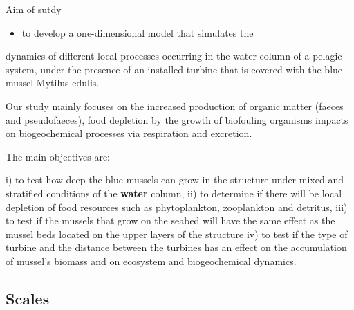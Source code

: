 \documentclass[final,xcolor=dvipsnames]{beamer}
\begin{document}
\begin{frame}
\begin{block}{Aim of sutdy}
\begin{itemize}
    \item to develop a one-dimensional model that simulates the
\end{itemize} 
dynamics of different local processes occurring in the water column of a pelagic
system, under the presence of an installed turbine that is covered with the blue
mussel Mytilus edulis.

Our study mainly focuses on
the increased production of organic matter (faeces and pseudofaeces),
food depletion by the growth of biofouling organisms
impacts on biogeochemical processes via respiration and excretion. 

The main objectives are: 

i) to test how deep the blue mussels can grow in the structure under mixed and stratified conditions of the \textbf<2>{water} column,
ii) to determine if there will be local depletion of food resources
such as phytoplankton, zooplankton and detritus,
iii) to test if the mussels that grow on the seabed will have the same effect as the mussel beds located on the upper layers of the structure iv) to test if the type of turbine and the distance between the turbines has an effect on the accumulation of mussel’s biomass and on ecosystem and biogeochemical dynamics.
\end{block}
\end{frame}

\subsection{Scales}
\end{document}
